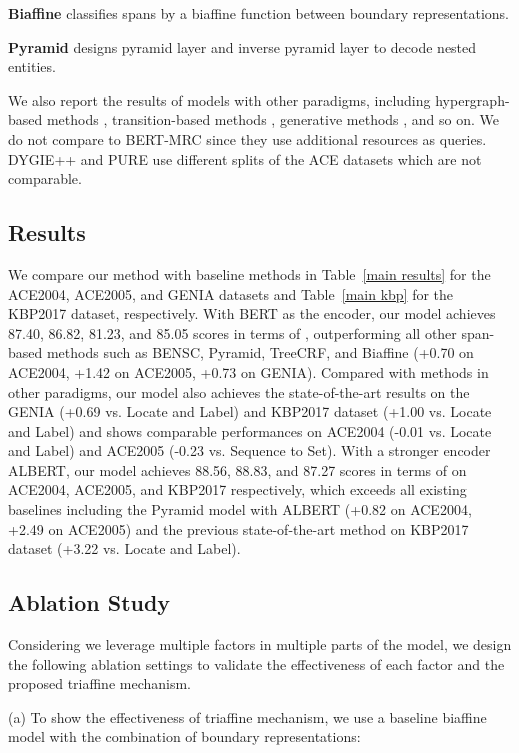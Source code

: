 \documentclass[11pt]{article}
\begin{document}
\noindent\textbf{Biaffine} \cite{yu2020named} classifies spans by a biaffine function between boundary representations.

\noindent\textbf{Pyramid} \cite{wang2020pyramid} designs pyramid layer and inverse pyramid layer to decode nested entities. 

We also report the results of models with other paradigms, including hypergraph-based methods \cite{sh}, transition-based methods \cite{mergelabel}, generative methods \cite{bartner,tan2021sequence,shen2021locate}, and so on.
We do not compare to BERT-MRC \cite{li2019unified} since they use additional resources as queries.
DYGIE++ \cite{wadden2019entity} and PURE \cite{zhong2021frustratingly} use different splits of the ACE datasets which are not comparable.


\subsection {Results}
We compare our method with baseline methods in Table~\ref{main results} for the ACE2004, ACE2005, and GENIA datasets and Table~\ref{main kbp} for the KBP2017 dataset, respectively.
With BERT as the encoder, our model achieves 87.40, 86.82, 81.23, and 85.05 scores in terms of , outperforming all other span-based methods such as BENSC, Pyramid, TreeCRF, and Biaffine (+0.70 on ACE2004, +1.42 on ACE2005, +0.73 on GENIA). 
Compared with methods in other paradigms, our model also achieves the state-of-the-art results on the GENIA (+0.69 vs. Locate and Label) and KBP2017 dataset (+1.00 vs. Locate and Label) and shows comparable performances on ACE2004 (-0.01 vs. Locate and Label) and ACE2005 (-0.23 vs. Sequence to Set).
With a stronger encoder ALBERT, our model achieves 88.56, 88.83, and 87.27 scores in terms of  on ACE2004, ACE2005, and KBP2017 respectively, which exceeds all existing baselines including the Pyramid model with ALBERT (+0.82 on ACE2004, +2.49 on ACE2005) and the previous state-of-the-art method on KBP2017 dataset (+3.22 vs. Locate and Label).

\subsection{Ablation Study}

Considering we leverage multiple factors in multiple parts of the model, we design the following ablation settings to validate the effectiveness of each factor and the proposed triaffine mechanism.

   \noindent(a) To show the effectiveness of triaffine mechanism, we use
   a baseline biaffine model with the combination of boundary representations:
    
\end{document}
